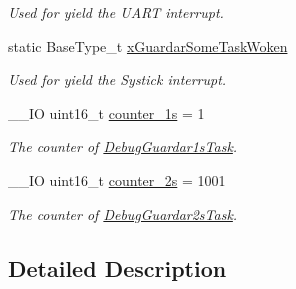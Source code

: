 \begin{DoxyCompactItemize}
\begin{DoxyCompactList}\small\item\em Used for yield the U\+A\+RT interrupt. \end{DoxyCompactList}\item 
static Base\+Type\+\_\+t \hyperlink{group___debug___private___variables_ga5ab62a235f978d6271ac56aa61c477dd}{x\+Guardar\+Some\+Task\+Woken}\hypertarget{group___debug___private___variables_ga5ab62a235f978d6271ac56aa61c477dd}{}\label{group___debug___private___variables_ga5ab62a235f978d6271ac56aa61c477dd}

\begin{DoxyCompactList}\small\item\em Used for yield the Systick interrupt. \end{DoxyCompactList}\item 
\+\_\+\+\_\+\+IO uint16\+\_\+t \hyperlink{group___debug___private___variables_ga141b0389ff1db82e53a437f466e70ed5}{counter\+\_\+1s} = 1\hypertarget{group___debug___private___variables_ga141b0389ff1db82e53a437f466e70ed5}{}\label{group___debug___private___variables_ga141b0389ff1db82e53a437f466e70ed5}

\begin{DoxyCompactList}\small\item\em The counter of \hyperlink{group___debug___exported___functions___group3_ga5e54537eed1694dae3ea8e6cce3f9b3a}{Debug\+Guardar1s\+Task}. \end{DoxyCompactList}\item 
\+\_\+\+\_\+\+IO uint16\+\_\+t \hyperlink{group___debug___private___variables_gace66769896763a0b6444579cc34c8aaf}{counter\+\_\+2s} = 1001\hypertarget{group___debug___private___variables_gace66769896763a0b6444579cc34c8aaf}{}\label{group___debug___private___variables_gace66769896763a0b6444579cc34c8aaf}

\begin{DoxyCompactList}\small\item\em The counter of \hyperlink{group___debug___exported___functions___group3_gadc8fe8277ada7992dddff220a145eb5f}{Debug\+Guardar2s\+Task}. \end{DoxyCompactList}\end{DoxyCompactItemize}


\subsection{Detailed Description}
